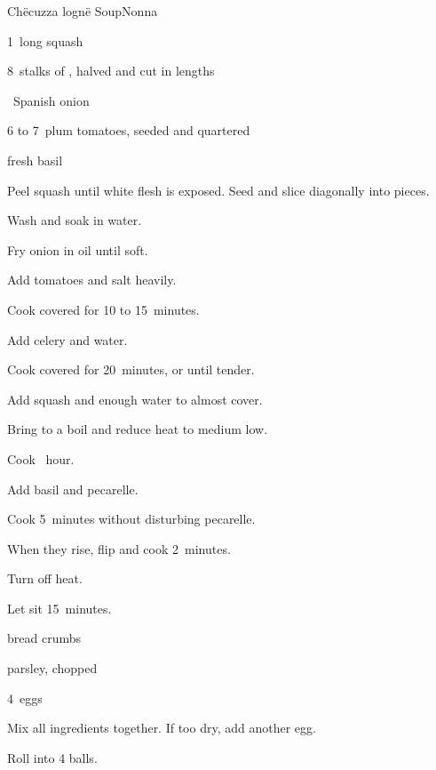 \begin{recipe}{Ch\"ecuzza logn\"e Soup}{Nonna}{}

\begin{ingredients}
\item 1~long squash
\item 8~stalks of , halved and cut in  lengths
\item \half~Spanish onion
\item 6 to 7~plum tomatoes, seeded and quartered
\item fresh basil
\end{ingredients}

\begin{directions}
\item Peel squash until white flesh is exposed. Seed and slice diagonally into \inch{\threequarter} pieces.
\item Wash and soak in water.
\item Fry onion in oil until soft.
\item Add tomatoes and salt heavily.
\item Cook covered for 10 to 15~minutes.
\item Add celery and  water.
\item Cook covered for 20~minutes, or until tender.
\item Add squash and enough water to almost cover.
\item Bring to a boil and reduce heat to medium low.
\item Cook \half~hour.
\item Add basil and pecarelle.
\item Cook 5~minutes without disturbing pecarelle.
\item When they rise, flip and cook 2~minutes.
\item Turn off heat.
\item Let sit 15~minutes.
\end{directions}

\begin{ingredients}
\item \C{\threequarter} bread crumbs
\item {} 
\item parsley, chopped
\item 4~eggs
\end{ingredients}

\begin{directions}
\item Mix all ingredients together. If too dry, add another egg.
\item Roll into 4 balls.
\end{directions}

\end{recipe}
